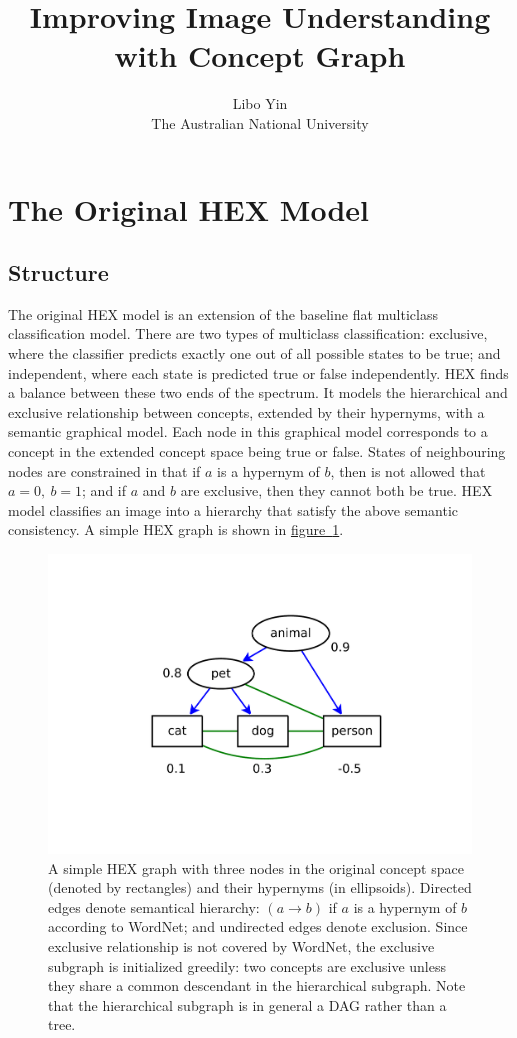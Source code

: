\documentclass[11pt,a4paper]{article}
\begin{document}
\title{Improving Image Understanding with Concept Graph}
\author{Libo Yin\\The Australian National University}
\maketitle
\section{The Original HEX Model}
\subsection{Structure}

The original HEX model \cite{deng2014large} is an extension of the baseline flat multiclass classification model. There are two types of multiclass classification: exclusive, where the classifier predicts exactly one out of all possible states to be true; and independent, where each state is predicted true or false independently. HEX finds a balance between these two ends of the spectrum. It models the hierarchical and exclusive relationship between concepts, extended by their hypernyms, with a semantic graphical model. Each node in this graphical model corresponds to a concept in the extended concept space being true or false. States of neighbouring nodes are constrained in that if $a$ is a hypernym of $b$, then is not allowed that $a=0,\ b=1$; and if $a$ and $b$ are exclusive, then they cannot both be true. HEX model classifies an image into a hierarchy that satisfy the above semantic consistency. A simple HEX graph is shown in \hyperref[fig:naive]{figure~\ref{fig:naive}}.
\begin{figure}[htbp]
\centering
\includegraphics[scale=0.5]{naive.pdf}
\caption{A simple HEX graph with three nodes in the original concept space (denoted by rectangles) and their hypernyms (in ellipsoids). Directed edges denote semantical hierarchy: $(a\rightarrow b)$ if $a$ is a hypernym of $b$ according to WordNet; and undirected edges denote exclusion. Since exclusive relationship is not covered by WordNet, the exclusive subgraph is initialized greedily: two concepts are exclusive unless they share a common descendant in the hierarchical subgraph. Note that the hierarchical subgraph is in general a DAG rather than a tree.}
\label{fig:naive}
\end{figure}
\end{document}
